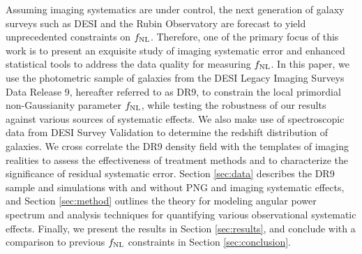 Assuming imaging systematics are under control, the next generation of galaxy surveys such as DESI and the Rubin Observatory are forecast to yield unprecedented constraints on $f_{\rm NL}$. Therefore, one of the primary focus of this work is to present an exquisite study of imaging systematic error and enhanced statistical tools to address the data quality for measuring $f_{\rm NL}$. In this paper, we use the photometric sample of galaxies from the DESI Legacy Imaging Surveys Data Release 9, hereafter referred to as DR9, to constrain the local primordial non-Gaussianity parameter $f_{\rm NL}$, while testing the robustness of our results against various sources of systematic effects. We also make use of spectroscopic data from DESI Survey Validation to determine the redshift distribution of galaxies. We cross correlate the DR9 density field with the templates of imaging realities to assess the effectiveness of treatment methods and to characterize the significance of residual systematic error. Section \ref{sec:data} describes the DR9 sample and simulations with and without PNG and imaging systematic effects, and Section \ref{sec:method} outlines the theory for modeling angular power spectrum and analysis techniques for quantifying various observational systematic effects. Finally, we present the results in Section \ref{sec:results}, and conclude with a comparison to previous $f_{\rm NL}$ constraints in Section \ref{sec:conclusion}.